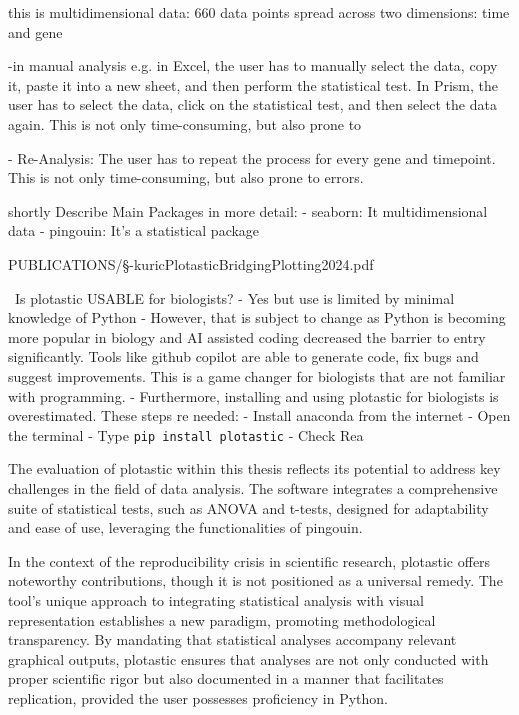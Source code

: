 this is multidimensional data:  660 data points spread across two dimensions: time
and gene

-in manual analysis e.g. in Excel, the user has to manually select the
data, copy it, paste it into a new sheet, and then perform the
statistical test. In Prism, the user has to select the data, click on
the statistical test, and then select the data again. This is not only
time-consuming, but also prone to

- Re-Analysis: The user has to repeat the process for every gene and
timepoint. This is not only time-consuming, but also prone to errors.

shortly Describe Main Packages in more detail:
- seaborn: It multidimensional data
- pingouin: It's a statistical package

{PUBLICATIONS/§-kuricPlotasticBridgingPlotting2024.pdf}



\
Is plotastic USABLE for biologists?
- Yes but use is limited by minimal knowledge of Python
- However, that is subject to change as Python is becoming more popular
in biology and AI assisted coding decreased the barrier to entry
significantly. Tools like github copilot are able to generate code, fix
bugs and suggest improvements. This is a game changer for biologists
that are not familiar with programming.
- Furthermore, installing and using plotastic for biologists is overestimated. These
steps re needed:
- Install anaconda from the internet
- Open the terminal
- Type \texttt{pip install plotastic}
- Check Rea


The evaluation of plotastic within this thesis reflects its potential to address
key challenges in the field of data analysis. The software integrates a
comprehensive suite of statistical tests, such as ANOVA and t-tests, designed
for adaptability and ease of use, leveraging the functionalities of pingouin.

In the context of the reproducibility crisis in scientific research, plotastic
offers noteworthy contributions, though it is not positioned as a universal
remedy. The tool's unique approach to integrating statistical analysis with
visual representation establishes a new paradigm, promoting methodological
transparency. By mandating that statistical analyses accompany relevant
graphical outputs, plotastic ensures that analyses are not only conducted with
proper scientific rigor but also documented in a manner that facilitates
replication, provided the user possesses proficiency in Python.

